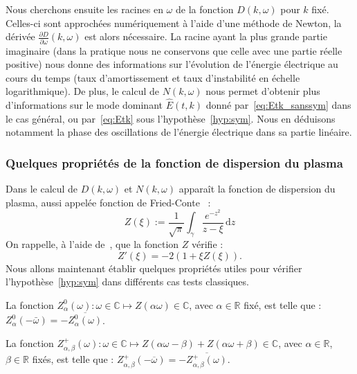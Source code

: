 Nous cherchons ensuite les racines en $\omega$ de la fonction $D(k,\omega)$ pour $k$ fixé. Celles-ci sont approchées numériquement à l'aide d'une méthode de Newton, la dérivée $\frac{\partial D}{\partial\omega}(k,\omega)$ est alors nécessaire. La racine ayant la plus grande partie imaginaire (dans la pratique nous ne conservons que celle avec une partie réelle positive) nous donne des informations sur l'évolution de l'énergie électrique au cours du temps (taux d'amortissement et taux d'instabilité en échelle logarithmique). De plus, le calcul de $N(k,\omega)$ nous permet d'obtenir plus d'informations sur le mode dominant $\hat{E}(t,k)$ donné par~\eqref{eq:Etk_sanssym} dans le cas général, ou par~\eqref{eq:Etk} sous l'hypothèse~\ref{hyp:sym}. Nous en déduisons notamment la phase des oscillations de l'énergie électrique dans sa partie linéaire.


\subsubsection{Quelques propriétés de la fonction de dispersion du plasma}

Dans le calcul de $D(k,\omega)$ et $N(k,\omega)$ apparaît la fonction de dispersion du plasma, aussi appelée fonction de Fried-Conte~\cite{Fried:1961} :
\begin{equation}
  Z(\xi):=\frac{1}{\sqrt{\pi}} \int_\gamma \frac{e^{-z^2}}{z-\xi}\,\mathrm{d}z
  \label{eq:Zfct}
\end{equation}
On rappelle, à l'aide de~\cite{Fried:1961}, que la fonction $Z$ vérifie :
\begin{equation}
  Z'(\xi)=-2\left(1+\xi Z(\xi)\right).
  \label{eq:Zder}
\end{equation}
Nous allons maintenant établir quelques propriétés utiles pour vérifier l'hypothèse~\ref{hyp:sym} dans différents cas tests classiques.

\begin{lemma}
  La fonction $Z_\alpha^0(\omega):\omega\in\mathbb{C}\mapsto Z\left(\alpha\omega\right)\in\mathbb{C}$, avec $\alpha\in\mathbb{R}$ fixé, est telle que : $Z_\alpha^0(-\bar{\omega}) = -\overline{Z_\alpha^0(\omega)}$.
  \label{lemma:Z0}
\end{lemma}

\begin{lemma}
  La fonction $Z_{\alpha,\beta}^+(\omega):\omega\in\mathbb{C}\mapsto Z\left(\alpha\omega-\beta\right)+Z\left(\alpha\omega+\beta\right)\in\mathbb{C}$, avec $\alpha\in\mathbb{R}$, $\beta\in\mathbb{R}$ fixés, est telle que : $Z_{\alpha,\beta}^+\left(-\overline{\omega}\right)=-\overline{Z_{\alpha,\beta}^+(\omega)}$.
  \label{lemma:Z+}
\end{lemma}

